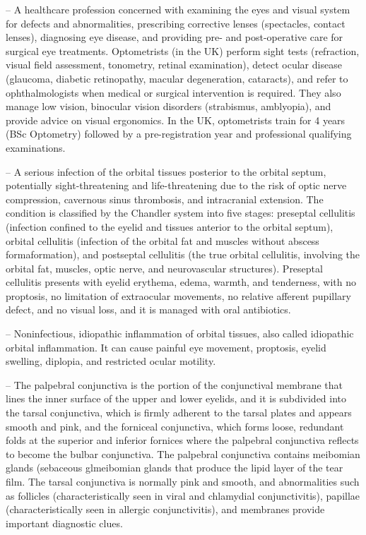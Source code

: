 -- A healthcare profession concerned with examining the eyes and visual system for defects and abnormalities, prescribing corrective lenses (spectacles, contact lenses), diagnosing eye disease, and providing pre- and post-operative care for surgical eye treatments. Optometrists (in the UK) perform sight tests (refraction, visual field assessment, tonometry, retinal examination), detect ocular disease (glaucoma, diabetic retinopathy, macular degeneration, cataracts), and refer to ophthalmologists when medical or surgical intervention is required. They also manage low vision, binocular vision disorders (strabismus, amblyopia), and provide advice on visual ergonomics. In the UK, optometrists train for 4 years (BSc Optometry) followed by a pre-registration year and professional qualifying examinations.

-- A serious infection of the orbital tissues posterior to the orbital septum, potentially sight-threatening and life-threatening due to the risk of optic nerve compression, cavernous sinus thrombosis, and intracranial extension. The condition is classified by the Chandler system into five stages: preseptal cellulitis (infection confined to the eyelid and tissues anterior to the orbital septum), orbital cellulitis (infection of the orbital fat and muscles without abscess formaformation), and postseptal cellulitis (the true orbital cellulitis, involving the orbital fat, muscles, optic nerve, and neurovascular structures). Preseptal cellulitis presents with eyelid erythema, edema, warmth, and tenderness, with no proptosis, no limitation of extraocular movements, no relative afferent pupillary defect, and no visual loss, and it is managed with oral antibiotics.

-- Noninfectious, idiopathic inflammation of orbital tissues, also called idiopathic orbital inflammation. It can cause painful eye movement, proptosis, eyelid swelling, diplopia, and restricted ocular motility.

-- The palpebral conjunctiva is the portion of the conjunctival membrane that lines the inner surface of the upper and lower eyelids, and it is subdivided into the tarsal conjunctiva, which is firmly adherent to the tarsal plates and appears smooth and pink, and the forniceal conjunctiva, which forms loose, redundant folds at the superior and inferior fornices where the palpebral conjunctiva reflects to become the bulbar conjunctiva. The palpebral conjunctiva contains meibomian glands (sebaceous glmeibomian glands that produce the lipid layer of the tear film. The tarsal conjunctiva is normally pink and smooth, and abnormalities such as follicles (characteristically seen in viral and chlamydial conjunctivitis), papillae (characteristically seen in allergic conjunctivitis), and membranes provide important diagnostic clues.

